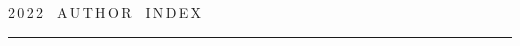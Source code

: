 

\def\leftfootline{\small{\textbf{\thepage}


\hfill СИСТЕМЫ И СРЕДСТВА ИНФОРМАТИКИ\ \ \ выпуск~32\ \ \ №~4\ \ \ 2022}


}%


 \def\rightfootline{\small{СИСТЕМЫ И СРЕДСТВА ИНФОРМАТИКИ\ \ \ выпуск~32\ \ \


№~4\ \ \ 2022


 \hfill \textbf{\thepage}}}


 \label{end\stat}





\newpage





\def\stat{cont-e}


{%




\raggedleft\Large \bf%


2\,0\,2\,2\ \ A\,U\,T\,H\,O\,R\ \ I\,N\,D\,E\,X \vskip 17pt


 \hrule


 \par




 }





\label{st\stat}

















\def\leftkol{\ } %


\def\rightkol{\ } %















